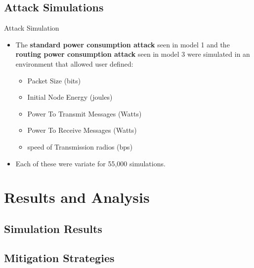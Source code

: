 \documentclass{beamer}
\begin{document}
\subsection{Attack Simulations}

\begin{frame}{Attack Simulation}
	\begin{itemize}
	\item The \textbf{standard power consumption attack} seen in model 1 and the \textbf{routing power consumption attack} seen in model 3 were simulated in an environment that allowed user defined: 
	\begin{itemize}
		\item Packet Size (bits)
		\item Initial Node Energy (joules)
		\item Power To Transmit Messages (Watts)
		\item Power To Receive Messages (Watts)
		\item speed of Transmission radios (bps)
	\end{itemize}
	\item Each of these were variate for 55,000 simulations.
	
	\end{itemize}
\end{frame}



\section{Results and Analysis}

\subsection{Simulation Results}

\subsection{Mitigation Strategies}
\end{document}
